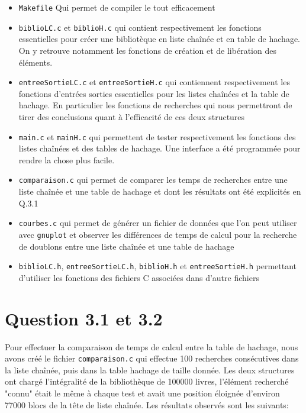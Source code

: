 \documentclass{article}
\begin{document}
    \begin{itemize}
        \item \texttt{Makefile} Qui permet de compiler le tout efficacement
        \item \texttt{biblioLC.c} et \texttt{biblioH.c} qui contient respectivement
        les fonctions essentielles pour créer une bibliotèque en liste chaînée et
        en table de hachage. On y retrouve notamment les fonctions de création et
        de libération des éléments.
        \item \texttt{entreeSortieLC.c} et \texttt{entreeSortieH.c} qui contiennent
        respectivement les fonctions d'entrées sorties essentielles pour les listes chaînées
        et la table de hachage. En particulier les fonctions de recherches qui nous
        permettront de tirer des conclusions quant à l'efficacité de ces deux structures
        \item \texttt{main.c} et \texttt{mainH.c} qui permettent de tester respectivement
        les fonctions des listes chaînées et des tables de hachage. Une interface a été
        programmée pour rendre la chose plus facile.
        \item \texttt{comparaison.c} qui permet de comparer les temps de recherches entre
        une liste chaînée et une table de hachage et dont les résultats ont été explicités
        en Q.3.1
        \item \texttt{courbes.c} qui permet de générer un fichier de données 
        que l'on peut utiliser avec \texttt{gnuplot} et observer les différences
        de temps de calcul pour la recherche de doublons entre une liste chaînée et
        une table de hachage
        \item \texttt{biblioLC.h}, \texttt{entreeSortieLC.h}, \texttt{biblioH.h} et \texttt{entreeSortieH.h}
        permettant d'utiliser les fonctions des fichiers C associées dans d'autre fichiers
    \end{itemize}
    

    \newpage
    \section{Question 3.1 et 3.2}

    Pour effectuer la comparaison de temps de calcul entre la table de hachage, nous avons créé
    le fichier \texttt{comparaison.c} qui effectue 100 recherches consécutives 
    dans la liste chaînée, puis dans la table hachage de taille donnée. 
    \newline
    Les deux structures ont chargé l'intégralité de la bibliothèque de 100000 livres,
    l'élément recherché "connu" était le même à chaque test et avait une position éloignée
    d'environ 77000 blocs de la tête de liste chaînée.
    \newline
    Les résultats observés sont les suivants:
\end{document}
